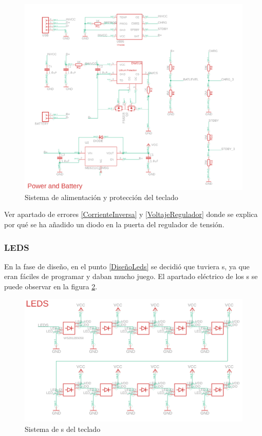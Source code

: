 \begin{figure}[H]
    \centering
    \includegraphics[width=1.0\textwidth]{imagenes/Capitulos/Cap04/Battery.png}
    \caption{Sistema de alimentación y protección del teclado \cite{Repo:ImagenCircuito}}
    \label{fig:CircuitoBateriaAlimentacion}
\end{figure}

\begin{tcolorbox}[colback=red!11!white, colframe=red!50!white, title=Errores]
    Ver apartado de errores \ref{CorrienteInversa} y \ref{VoltajeRegulador} donde se explica por qué se ha añadido un diodo en la puerta del regulador de tensión.
\end{tcolorbox}

\newpage
\subsubsection{\gls{LED}S}
En la fase de diseño, en el punto \ref{DiseñoLeds} se decidió que tuviera s, ya que eran fáciles de programar y daban mucho juego. El apartado eléctrico de los s se puede observar en la figura \ref{fig:CircuitoLeds}.

\begin{figure}[H]
    \centering
    \includegraphics[width=1.0\textwidth]{imagenes/Capitulos/Cap04/LEDs.png}
    \caption{Sistema de s del teclado \cite{Repo:ImagenCircuito}}
    \label{fig:CircuitoLeds}
\end{figure}

